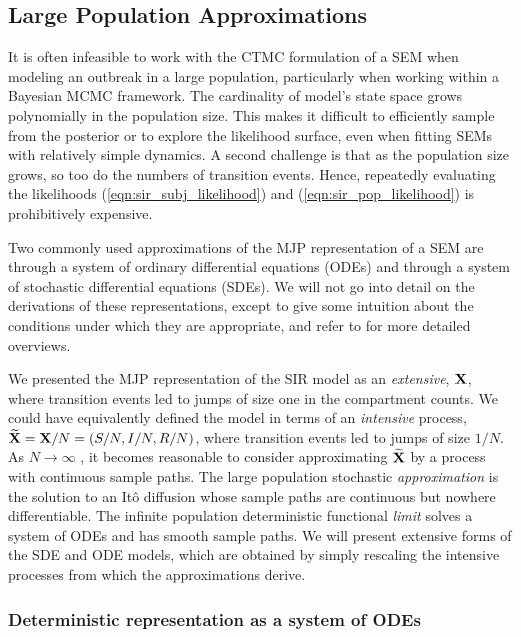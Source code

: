 \subsection{Large Population Approximations}
\label{subsec:sem_approximations}

It is often infeasible to work with the CTMC formulation of a SEM when modeling an outbreak in a large population, particularly when working within a Bayesian MCMC framework. The cardinality of model's state space grows polynomially in the population size. This makes it difficult to efficiently sample from the posterior or to explore the likelihood surface, even when fitting SEMs with relatively simple dynamics. A second challenge is that as the population size grows, so too do the numbers of transition events. Hence, repeatedly evaluating the likelihoods (\ref{eqn:sir_subj_likelihood}) and (\ref{eqn:sir_pop_likelihood}) is prohibitively expensive. 

Two commonly used approximations of the MJP representation of a SEM are through a system of ordinary differential equations (ODEs) and through a system of stochastic differential equations (SDEs). We will not go into detail on the derivations of these representations, except to give some intuition about the conditions under which they are appropriate, and refer to \cite{allen2017primer,greenwood2009stochastic} for more detailed overviews. 

We presented the MJP representation of the SIR model as an \textit{extensive}, $ \mathbf{X} $, where transition events led to jumps of size one in the compartment counts. We could have equivalently defined the model in terms of an \textit{intensive} process, $ \widetilde{\mathbf{X}} = \mathbf{X} / N = (S/N,I/N,R/N) $, where transition events led to jumps of size $ 1/N $. As $ N\longrightarrow \infty$ , it becomes reasonable to consider approximating $ \widetilde{\mathbf{X}} $ by a process with continuous sample paths. The large population stochastic \textit{approximation} is the solution to an It\^{o} diffusion whose sample paths are continuous but nowhere differentiable. The infinite population deterministic functional \textit{limit} solves a system of ODEs and has smooth sample paths. We will present extensive forms of the SDE and ODE models, which are obtained by simply rescaling the intensive processes from which the approximations derive. 

\subsubsection{Deterministic representation as a system of ODEs}
\label{subsec:deterministic_models}

